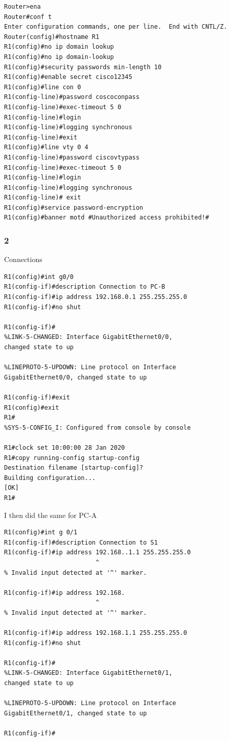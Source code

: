\documentclass[../EngineeringJournal_CDavis.tex]{subfiles}
\begin{document}
\begin{mdframed}
\scriptsize
\begin{verbatim}
Router>ena
Router#conf t
Enter configuration commands, one per line.  End with CNTL/Z.
Router(config)#hostname R1
R1(config)#no ip domain lookup
R1(config)#no ip domain-lookup
R1(config)#security passwords min-length 10
R1(config)#enable secret cisco12345
R1(config)#line con 0
R1(config-line)#password coscoconpass
R1(config-line)#exec-timeout 5 0
R1(config-line)#login
R1(config-line)#logging synchronous
R1(config-line)#exit
R1(config)#line vty 0 4
R1(config-line)#password ciscovtypass
R1(config-line)#exec-timeout 5 0
R1(config-line)#login
R1(config-line)#logging synchronous
R1(config-line)# exit
R1(config)#service password-encryption
R1(config)#banner motd #Unauthorized access prohibited!#
\end{verbatim}
\normalsize
\end{mdframed}

\subsubsection{2}{Connections}
\begin{multicols}{2}
\begin{mdframed}
\scriptsize
\begin{verbatim}
R1(config)#int g0/0
R1(config-if)#description Connection to PC-B
R1(config-if)#ip address 192.168.0.1 255.255.255.0
R1(config-if)#no shut

R1(config-if)#
%LINK-5-CHANGED: Interface GigabitEthernet0/0,
changed state to up

%LINEPROTO-5-UPDOWN: Line protocol on Interface 
GigabitEthernet0/0, changed state to up

R1(config-if)#exit
R1(config)#exit
R1#
%SYS-5-CONFIG_I: Configured from console by console

R1#clock set 10:00:00 28 Jan 2020
R1#copy running-config startup-config
Destination filename [startup-config]? 
Building configuration...
[OK]
R1#
\end{verbatim}
\normalsize
\end{mdframed}

I then did the same for PC-A
\begin{mdframed}
\scriptsize
\begin{verbatim}
R1(config)#int g 0/1
R1(config-if)#description Connection to S1
R1(config-if)#ip address 192.168..1.1 255.255.255.0
                         ^
% Invalid input detected at '^' marker.
	
R1(config-if)#ip address 192.168.
                         ^
% Invalid input detected at '^' marker.
	
R1(config-if)#ip address 192.168.1.1 255.255.255.0
R1(config-if)#no shut

R1(config-if)#
%LINK-5-CHANGED: Interface GigabitEthernet0/1,
changed state to up

%LINEPROTO-5-UPDOWN: Line protocol on Interface 
GigabitEthernet0/1, changed state to up

R1(config-if)#
\end{verbatim}
\normalsize
\end{mdframed}
\end{multicols}
\end{document}
